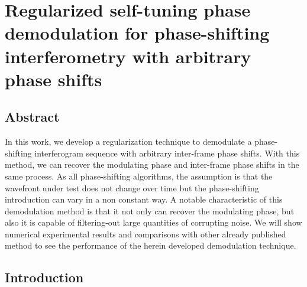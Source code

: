 \chapter{Regularized self-tuning phase demodulation for phase-shifting
interferometry with arbitrary phase shifts}

\section{Abstract}
In this work, we develop a regularization technique to demodulate
a phase-shifting interferogram sequence with arbitrary inter-frame
phase shifts. With this method, we can recover the modulating phase
and inter-frame phase shifts in the same process. As all phase-shifting
algorithms, the assumption is that the wavefront under test does not
change over time but the phase-shifting introduction can vary in a
non constant way. A notable characteristic of this demodulation method
is that it not only can recover the modulating phase, but also it
is capable of filtering-out large quantities of corrupting noise.
We will show numerical experimental results and comparisons with other
already published method to see the performance of the herein developed
demodulation technique.

\section{Introduction}

